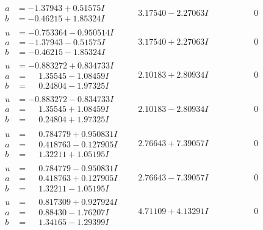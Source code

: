 \documentclass[1p]{elsarticle_modified}
\theoremstyle{definition}
\begin{document}
$$\begin{array}{c|c|c}
\begin{aligned}
a &= -1.37943 + 0.51575 I \\
b &= -0.46215 + 1.85324 I\end{aligned}
 & \phantom{-}3.17540 - 2.27063 I & \phantom{-0.000000 } 0 \\ \hline\begin{aligned}
u &= -0.753364 - 0.950514 I \\
a &= -1.37943 - 0.51575 I \\
b &= -0.46215 - 1.85324 I\end{aligned}
 & \phantom{-}3.17540 + 2.27063 I & \phantom{-0.000000 } 0 \\ \hline\begin{aligned}
u &= -0.883272 + 0.834733 I \\
a &= \phantom{-}1.35545 - 1.08459 I \\
b &= \phantom{-}0.24804 - 1.97325 I\end{aligned}
 & \phantom{-}2.10183 + 2.80934 I & \phantom{-0.000000 } 0 \\ \hline\begin{aligned}
u &= -0.883272 - 0.834733 I \\
a &= \phantom{-}1.35545 + 1.08459 I \\
b &= \phantom{-}0.24804 + 1.97325 I\end{aligned}
 & \phantom{-}2.10183 - 2.80934 I & \phantom{-0.000000 } 0 \\ \hline\begin{aligned}
u &= \phantom{-}0.784779 + 0.950831 I \\
a &= \phantom{-}0.418763 - 0.127905 I \\
b &= \phantom{-}1.32211 + 1.05195 I\end{aligned}
 & \phantom{-}2.76643 + 7.39057 I & \phantom{-0.000000 } 0 \\ \hline\begin{aligned}
u &= \phantom{-}0.784779 - 0.950831 I \\
a &= \phantom{-}0.418763 + 0.127905 I \\
b &= \phantom{-}1.32211 - 1.05195 I\end{aligned}
 & \phantom{-}2.76643 - 7.39057 I & \phantom{-0.000000 } 0 \\ \hline\begin{aligned}
u &= \phantom{-}0.817309 + 0.927924 I \\
a &= \phantom{-}0.88430 - 1.76207 I \\
b &= \phantom{-}1.34165 - 1.29399 I\end{aligned}
 & \phantom{-}4.71109 + 4.13291 I & \phantom{-0.000000 } 0 \\ \hline\begin{aligned}

\end{aligned}
\end{array}$$
\end{document}
